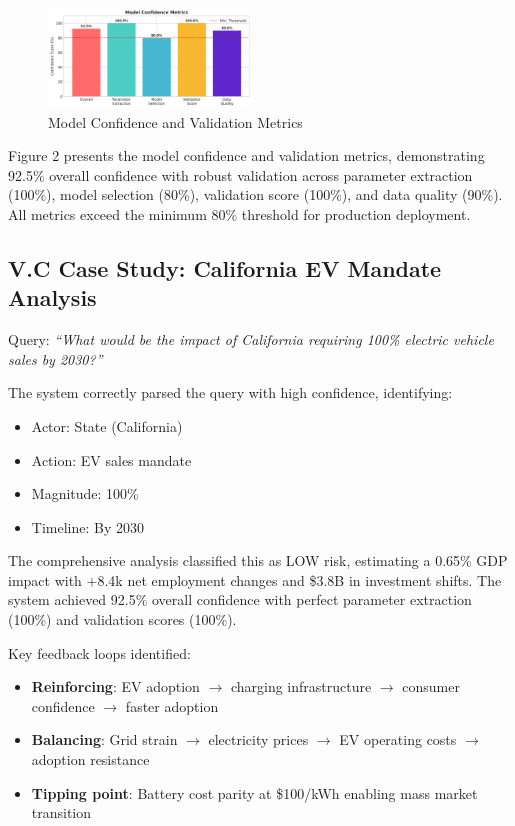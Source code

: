 \documentclass[10pt,twocolumn]{article}
\begin{document}
\begin{figure}[!htb]
\centering
\includegraphics[width=0.48\textwidth]{model_confidence_metrics.png}
\caption{Model Confidence and Validation Metrics}
\label{fig:confidence}
\end{figure}

Figure 2 presents the model confidence and validation metrics, demonstrating 92.5\% overall confidence with robust validation across parameter extraction (100\%), model selection (80\%), validation score (100\%), and data quality (90\%). All metrics exceed the minimum 80\% threshold for production deployment.

\subsection{V.C Case Study: California EV Mandate Analysis}

Query: \textit{``What would be the impact of California requiring 100\% electric vehicle sales by 2030?''}

The system correctly parsed the query with high confidence, identifying:
\begin{itemize}
\item Actor: State (California)
\item Action: EV sales mandate
\item Magnitude: 100\%
\item Timeline: By 2030
\end{itemize}

The comprehensive analysis classified this as LOW risk, estimating a 0.65\% GDP impact with +8.4k net employment changes and \$3.8B in investment shifts. The system achieved 92.5\% overall confidence with perfect parameter extraction (100\%) and validation scores (100\%).

Key feedback loops identified:
\begin{itemize}
\item \textbf{Reinforcing}: EV adoption $\rightarrow$ charging infrastructure $\rightarrow$ consumer confidence $\rightarrow$ faster adoption
\item \textbf{Balancing}: Grid strain $\rightarrow$ electricity prices $\rightarrow$ EV operating costs $\rightarrow$ adoption resistance
\item \textbf{Tipping point}: Battery cost parity at \$100/kWh enabling mass market transition
\end{itemize}
\end{document}
